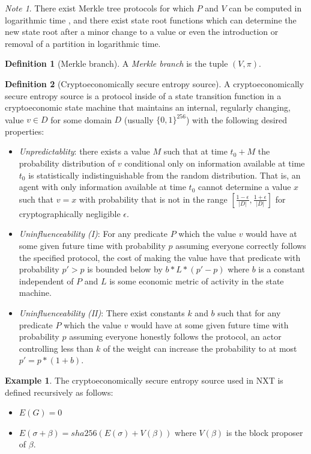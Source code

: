 \documentclass[11pt,a4paper]{report}
\theoremstyle{plain}
\theoremstyle{definition}
\newtheorem{defn}{Definition}[chapter]
\newtheorem{exmp}{Example}[section]
\theoremstyle{remark}
\newtheorem*{note}{Note}
\begin{document}
\begin{note}
There exist Merkle tree protocols for which $P$ and $V$ can be computed in logarithmic time \cite{merkle}, and there exist state root functions which can determine the new state root after a minor change to a value or even the introduction or removal of a partition in logarithmic time.
\end{note}

\begin{defn}[Merkle branch]
A \emph{Merkle branch} is the tuple $(V, \pi)$.
\end{defn}

\begin{defn}[Cryptoeconomically secure entropy source]
A cryptoeconomically secure entropy source is a protocol inside of a state transition function in a cryptoeconomic state machine that maintains an internal, regularly changing, value $v \in D$ for some domain $D$ (usually $\{0,1\}^{256}$) with the following desired properties:
\begin{itemize}
\item \emph{Unpredictablity}: there exists a value $M$ such that at time $t_0 + M$ the probability distribution of $v$ conditional only on information available at time $t_0$ is statistically indistinguishable from the random distribution. That is, an agent with only information available at time $t_0$ cannot determine a value $x$ such that $v = x$ with probability that is not in the range $[\frac{1 - \epsilon}{|D|}, \frac{1 + \epsilon}{|D|}]$ for cryptographically negligible $\epsilon$.
\item \emph{Uninfluenceability (I)}: For any predicate $P$ which the value $v$ would have at some given future time with probability $p$ assuming everyone correctly follows the specified protocol, the cost of making the value have that predicate with probability $p' > p$ is bounded below by $b * L * (p' - p)$ where $b$ is a constant independent of $P$ and $L$ is some economic metric of activity in the state machine.
\item \emph{Uninfluenceability (II)}: There exist constants $k$ and $b$ such that for any predicate $P$ which the value $v$ would have at some given future time with probability $p$ assuming everyone honestly follows the protocol, an actor controlling less than $k$ of the weight can increase the probability to at most $p' = p * (1 + b)$.
\end{itemize}
\end{defn}

\begin{exmp}
The cryptoeconomically secure entropy source used in NXT\cite{nxtinside} is defined recursively as follows:
\begin{itemize}
\item
$E(G) = 0$
\item 
$E(\sigma + \beta) = sha256(E(\sigma) + V(\beta))$ where $V(\beta)$ is the block proposer of $\beta$.
\end{itemize}
\end{exmp}
\end{document}
